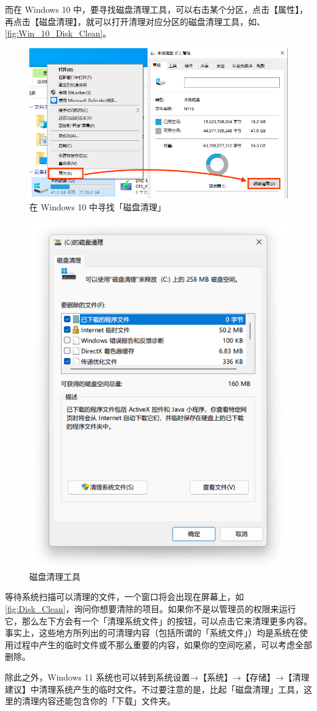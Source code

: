 {而在 Windows 10 中，要寻找磁盘清理工具，可以右击某个分区，点击【属性】，再点击【磁盘清理】，就可以打开清理对应分区的磁盘清理工具，如、\autoref{fig:Win_10_Disk_Clean}。

\begin{figure}[htb!]
  \centering
  \includegraphics[width=.68\textwidth]{assets/advanced/Win_10_Disk_Clean.png}
  \caption{在 Windows 10 中寻找「磁盘清理」}
  \label{fig:Win_10_Disk_Clean}
\end{figure}

\begin{figure}[htb!]
  \centering
  \includegraphics[width=.48\textwidth]{assets/advanced/Disk_Clean.png}
  \caption{磁盘清理工具}
  \label{fig:Disk_Clean}
\end{figure}

等待系统扫描可以清理的文件，一个窗口将会出现在屏幕上，如\autoref{fig:Disk_Clean}，询问你想要清除的项目。如果你不是以管理员的权限来运行它，那么左下方会有一个「清理系统文件」的按钮，可以点击它来清理更多内容。事实上，这些地方所列出的可清理内容（包括所谓的「系统文件」）均是系统在使用过程中产生的临时文件或不那么重要的内容，如果你的空间吃紧，可以考虑全部删除。

除此之外，Windows 11 系统也可以转到系统设置→【系统】→【存储】→【清理建议】中清理系统产生的临时文件。不过要注意的是，比起「磁盘清理」工具，这里的清理内容还能包含你的「下载」文件夹。

}

